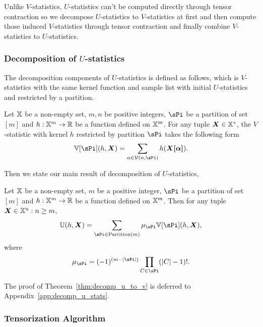 \documentclass[letterpaper,11pt]{article}
\newcommand{\pdfu}{\texorpdfstring{$U$}{U}}
\newcommand{\vset}{\calV}
\newcommand{\vsetp}[2]{\vset(#1,#2)}
\newcommand{\ustat}{\mathbb{U}}
\newcommand{\vstat}{\mathbb{V}}
\newcommand{\partition}{\mathrm{Partition}}
\newcommand{\partitionp}[1]{\partition(#1)}
\begin{document}
Unlike $V$-statistics, $U$-statistics can't be computed directly through tensor contraction so we decompose $U$-statistics to $V$-statistics at first and then compute those induced $V$-statistics through  tensor contraction and finally combine $V$-statistics to $U$-statistics. 

\subsubsection{Decomposition of \pdfu{}-statistics}

The decomposition components of $U$-statistics is defined as follows, which is $V$-statistics with the same kernel function and sample list with initial $U$-statistics and restricted by a partition. 

\begin{definition}\label{def:res_v_stat}
    Let ${\mathbb{X}}$ be a non-empty set, $m, n$ be positive integers, $\sPi$ be a partition of set $[m]$ and $h: {\mathbb{X}}^{m} \rightarrow {\mathbb{R}}$ be a function defined on ${\mathbb{X}}^m$. For any tuple $\bm{X} \in {\mathbb{X}}^*$, the $V$-statistic with kernel $h$ restricted by partition $\sPi$ takes the following form 
    \begin{align*}
       \vstat[\sPi](h,\bm{X}) = \sum_{\alpha \in \vsetp{n}{\sPi}} h(\bm{X[\alpha]}). 
    \end{align*}
\end{definition}

Then we state our main result of decomposition of $U$-statistics, 
\begin{theorem}\label{thm:decomp_u_to_v}
 Let ${\mathbb{X}}$ be a non-empty set, $m$ be a positive integer, $\sPi$ be a partition of set $[m]$ and $h: {\mathbb{X}}^{m} \rightarrow {\mathbb{R}}$ be a function defined on ${\mathbb{X}}^m$. Then for any tuple $\bm{X} \in {\mathbb{X}}^n: n \geq m$, 
\begin{align*}
    \ustat(h,\bm{X}) = \sum_{\sPi \in \partitionp{m}} 
    \mu_\sPi \vstat[\sPi](h, \bm{X}), 
\end{align*}
where
\begin{align*}
    \mu_\sPi = (-1)^{(m-|\sPi|)} \prod_{C \in \sPi} (|C| - 1)!. 
\end{align*}
\end{theorem}

The proof of Theorem~\ref{thm:decomp_u_to_v} is deferred to Appendix~\ref{app:decomp_u_stats}.

\subsubsection{Tensorization Algorithm}
\end{document}
